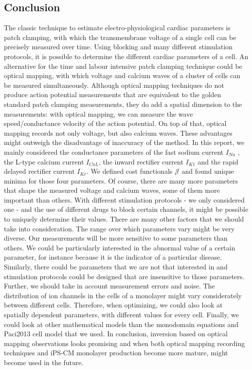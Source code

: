 \documentclass{article}
\begin{document}
\subsection{Conclusion} \label{Conclusion}
The classic technique to estimate electro-physiological cardiac parameters is patch clamping, with which the transmembrane voltage of a single cell can be precisely measured over time. Using blocking and many different stimulation protocols, it is possible to determine the different cardiac parameters of a cell. An alternative for the time and labour intensive patch clamping technique could be optical mapping, with which voltage and calcium waves of a cluster of cells can be measured simultaneously. Although optical mapping techniques do not produce action potential measurements that are equivalent to the golden standard patch clamping measurements, they do add a spatial dimension to the measurements: with optical mapping, we can measure the wave speed/conductance velocity of the action potential. On top of that, optical mapping records not only voltage, but also calcium waves. These advantages might outweigh the disadvantage of inaccuracy of the method. In this report, we mainly considered the conductance parameters of the fast sodium current $I_{Na}$ , the L-type calcium current $I_{CaL}$, the inward rectifier current $I_{K1}$ and the rapid delayed rectifier current $I_{Kr}$. We defined cost functionals $\mathcal{J}$ and found unique minima for those four parameters. Of course, there are many more parameters that shape the measured voltage and calcium waves, some of them more important than others. With different stimulation protocols - we only considered one - and the use of different drugs to block certain channels, it might be possible to uniquely determine their values. There are many other factors that we should take into consideration. The range over which parameters vary might be very diverse. Our measurements will be more sensitive to some parameters than others. We could be particularly interested in the abnormal value of a certain parameter, for instance because it is the indicator of a particular disease. Similarly, there could be parameters that we are not that interested in and stimulation protocols could be designed that are insensitive to those parameters. Further, we should take in account measurement errors and noise. The distribution of ion channels in the cells of a monolayer might vary considerately between different cells. Therefore, when optimizing, we could also look at spatially dependent parameters, with different values for every cell. Finally, we could look at other mathematical models than the monodomain equations and Paci2013 cell model that we used. In conclusion, inversion based on optical mapping observations looks promising and when both optical mapping recording techniques and iPS-CM monolayer production become more mature, might become used in the future.


%
\end{document}
